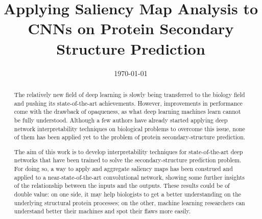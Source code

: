 \documentclass{ecsthesis}      %
\begin{document}
\frontmatter
\title      {Applying Saliency Map Analysis to CNNs on Protein Secondary Structure Prediction}
\addresses  {\groupname\\\deptname\\\univname}
\date       {\today}
\subject    {}
\keywords   {}
\begin{abstract}



The relatively new field of deep learning is slowly being transferred to the biology field and pushing its state-of-the-art achievements. However, improvements in performance come with the drawback of opaqueness, as what deep learning machines learn cannot be fully understood. Although a few authors have already started applying deep network interpretability techniques on biological problems to overcome this issue, none of them has been applied yet to the problem of protein secondary-structure prediction.

The aim of this work is to develop interpretability techniques for state-of-the-art deep networks that have been trained to solve the secondary-structure prediction problem. For doing so, a way to apply and aggregate saliency maps has been construed and applied to a near-state-of-the-art convolutional network, showing some further insights of the relationship between the inputs and the outputs. These results could be of double value: on one side, it may help biologists to get a better understanding on the underlying structural protein processes; on the other, machine learning researchers can understand better their machines and spot their flaws more easily.

\end{abstract}
\end{document}

